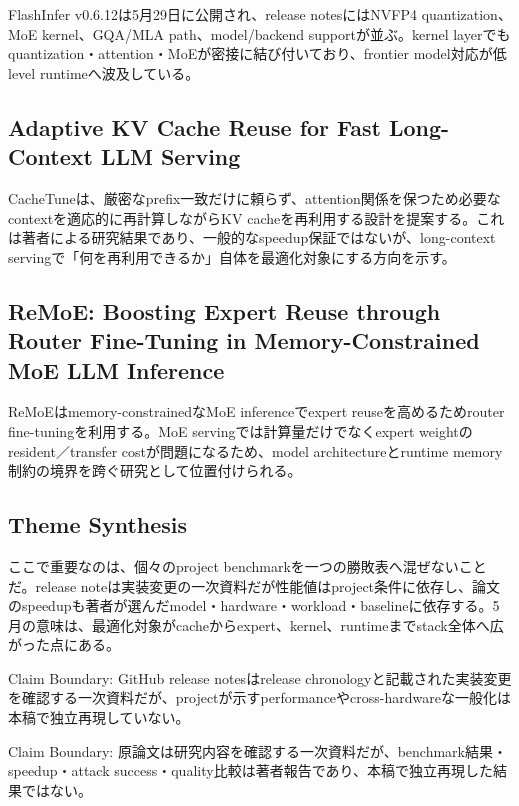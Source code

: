 FlashInfer v0.6.12は5月29日に公開され、release notesにはNVFP4 quantization、MoE kernel、GQA/MLA path、model/backend supportが並ぶ。kernel layerでもquantization・attention・MoEが密接に結び付いており、frontier model対応が低level runtimeへ波及している。\autocite{src-74a7052acd7a}


\subsection{Adaptive KV Cache Reuse for Fast Long-Context LLM Serving}

CacheTuneは、厳密なprefix一致だけに頼らず、attention関係を保つため必要なcontextを適応的に再計算しながらKV cacheを再利用する設計を提案する。これは著者による研究結果であり、一般的なspeedup保証ではないが、long-context servingで「何を再利用できるか」自体を最適化対象にする方向を示す。\autocite{src-3707e05fd2a3}


\subsection{ReMoE: Boosting Expert Reuse through Router Fine-Tuning in Memory-Constrained MoE LLM Inference}

ReMoEはmemory-constrainedなMoE inferenceでexpert reuseを高めるためrouter fine-tuningを利用する。MoE servingでは計算量だけでなくexpert weightのresident／transfer costが問題になるため、model architectureとruntime memory制約の境界を跨ぐ研究として位置付けられる。\autocite{src-ba75040df3fc}


\subsection{Theme Synthesis}

ここで重要なのは、個々のproject benchmarkを一つの勝敗表へ混ぜないことだ。release noteは実装変更の一次資料だが性能値はproject条件に依存し、論文のspeedupも著者が選んだmodel・hardware・workload・baselineに依存する。5月の意味は、最適化対象がcacheからexpert、kernel、runtimeまでstack全体へ広がった点にある。\autocite{src-3707e05fd2a3,src-5a693cfc6852,src-69c5523286bd,src-74a7052acd7a,src-77e29e3fac8f,src-80b8d67933c0,src-ba75040df3fc,src-c97320147e8c}


\begin{claimboundary}
Claim Boundary: GitHub release notesはrelease chronologyと記載された実装変更を確認する一次資料だが、projectが示すperformanceやcross-hardwareな一般化は本稿で独立再現していない。\autocite{src-3707e05fd2a3,src-5a693cfc6852,src-69c5523286bd,src-74a7052acd7a,src-77e29e3fac8f,src-80b8d67933c0,src-ba75040df3fc,src-c97320147e8c}
\end{claimboundary}

\begin{claimboundary}
Claim Boundary: 原論文は研究内容を確認する一次資料だが、benchmark結果・speedup・attack success・quality比較は著者報告であり、本稿で独立再現した結果ではない。\autocite{src-3707e05fd2a3,src-5a693cfc6852,src-69c5523286bd,src-74a7052acd7a,src-77e29e3fac8f,src-80b8d67933c0,src-ba75040df3fc,src-c97320147e8c}
\end{claimboundary}
